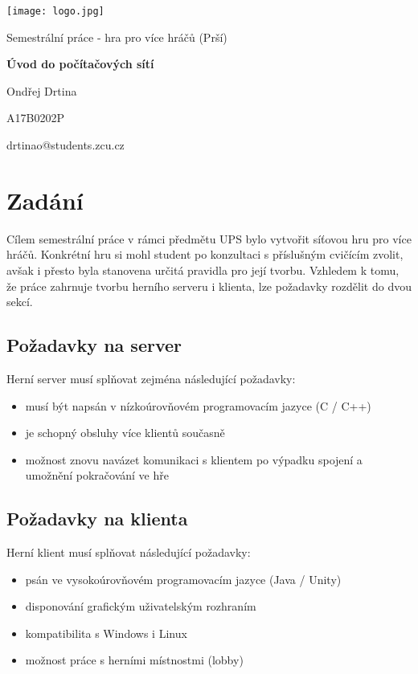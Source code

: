 \documentclass[12pt, a4paper, pdftex, czech, titlepage]{report}
\begin{document}
\begin{titlepage}
	\vspace*{-2cm}
	{\centering\texttt{[image: logo.jpg]}\par}
	\centering
	\vspace*{2cm}
	{\Large Semestrální práce - hra pro více hráčů (Prší)\par}
	\vspace{1.5cm}
	{\Huge\bfseries Úvod do počítačových sítí\par}
	\vspace{7cm}

		
	{\Large Ondřej Drtina\par}
	{\Large A17B0202P\par}
	{\Large drtinao@students.zcu.cz\par}
	\vfill
\end{titlepage}

\tableofcontents
\thispagestyle{empty}
\clearpage

\chapter{Zadání}
Cílem semestrální práce v rámci předmětu UPS bylo vytvořit síťovou hru pro více hráčů.
Konkrétní hru si mohl student po konzultaci s příslušným cvičícím zvolit,
avšak i přesto byla stanovena určitá pravidla pro její tvorbu. Vzhledem k tomu,
že práce zahrnuje tvorbu herního serveru i klienta, lze požadavky rozdělit do dvou
sekcí.
\section{Požadavky na server}
Herní server musí splňovat zejména následující požadavky:

\begin{itemize}
\item musí být napsán v nízkoúrovňovém programovacím jazyce (C / C++)
\item je schopný obsluhy více klientů současně
\item možnost znovu navázet komunikaci s klientem po výpadku spojení a umožnění pokračování ve hře
\end{itemize}

\section{Požadavky na klienta}
Herní klient musí splňovat následující požadavky:

\begin{itemize}
\item psán ve vysokoúrovňovém programovacím jazyce (Java / Unity)
\item disponování grafickým uživatelským rozhraním
\item kompatibilita s Windows i Linux
\item možnost práce s herními místnostmi (lobby)

\end{itemize}
\end{document}
